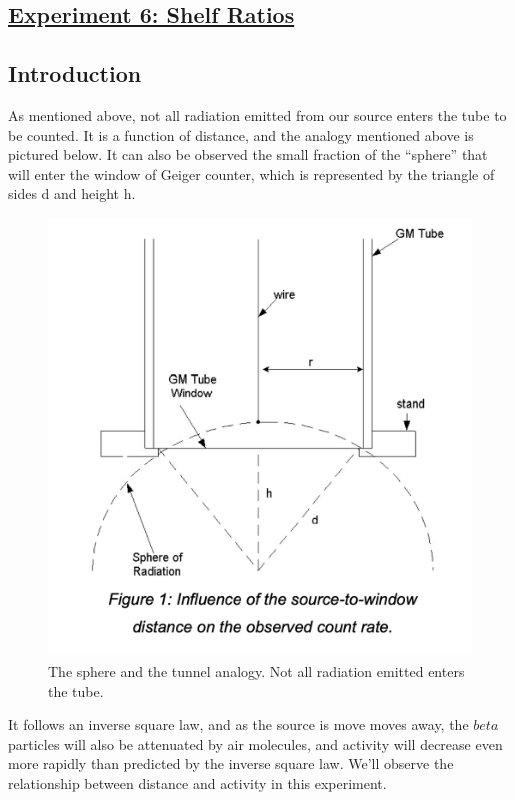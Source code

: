 \documentclass[twocolumn]{article}
\begin{document}
$$$$

\begin{center}\section*{\underline{Experiment 6: Shelf Ratios}}\end{center}
\subsection*{Introduction}
As mentioned above, not all radiation emitted from our source enters the tube to be counted. It is a function of distance, and the analogy mentioned above is pictured below. It can also be observed the small fraction of the “sphere” that will enter the window of Geiger counter, which is represented by the triangle of sides d and height h.
\begin{figure}[h!]
\centering
\includegraphics[scale=0.4]{sphere.png}
\caption{The sphere and the tunnel analogy. Not all radiation emitted enters the tube.}
\end{figure}
It follows an inverse square law, and as the source is move moves away, the $beta$ particles will also be attenuated by air molecules, and activity will decrease even more rapidly than predicted by the inverse square law. We'll observe the relationship between distance and activity in this experiment. \\
\end{document}
